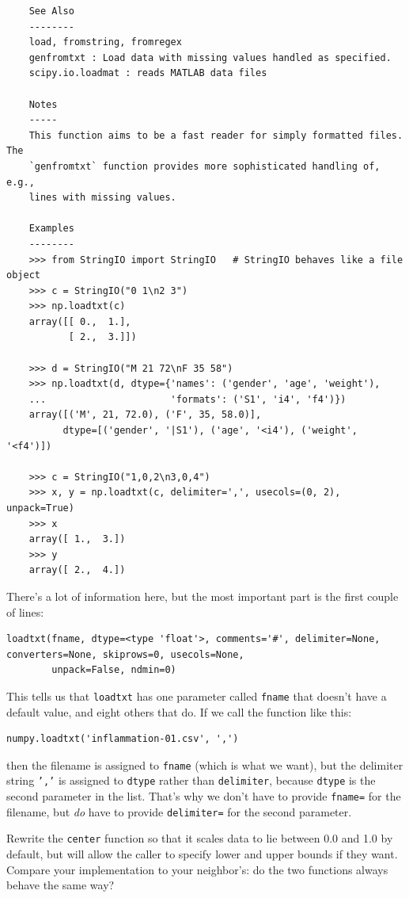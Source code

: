 \documentclass{book}
\begin{document}
\begin{verbatim}
    See Also
    --------
    load, fromstring, fromregex
    genfromtxt : Load data with missing values handled as specified.
    scipy.io.loadmat : reads MATLAB data files

    Notes
    -----
    This function aims to be a fast reader for simply formatted files.  The
    `genfromtxt` function provides more sophisticated handling of, e.g.,
    lines with missing values.

    Examples
    --------
    >>> from StringIO import StringIO   # StringIO behaves like a file object
    >>> c = StringIO("0 1\n2 3")
    >>> np.loadtxt(c)
    array([[ 0.,  1.],
           [ 2.,  3.]])

    >>> d = StringIO("M 21 72\nF 35 58")
    >>> np.loadtxt(d, dtype={'names': ('gender', 'age', 'weight'),
    ...                      'formats': ('S1', 'i4', 'f4')})
    array([('M', 21, 72.0), ('F', 35, 58.0)],
          dtype=[('gender', '|S1'), ('age', '<i4'), ('weight', '<f4')])

    >>> c = StringIO("1,0,2\n3,0,4")
    >>> x, y = np.loadtxt(c, delimiter=',', usecols=(0, 2), unpack=True)
    >>> x
    array([ 1.,  3.])
    >>> y
    array([ 2.,  4.])
\end{verbatim}

There's a lot of information here, but the most important part is the
first couple of lines:

\begin{verbatim}
loadtxt(fname, dtype=<type 'float'>, comments='#', delimiter=None, converters=None, skiprows=0, usecols=None,
        unpack=False, ndmin=0)
\end{verbatim}

This tells us that \texttt{loadtxt} has one parameter called
\texttt{fname} that doesn't have a default value, and eight others that
do. If we call the function like this:

\begin{verbatim}
numpy.loadtxt('inflammation-01.csv', ',')
\end{verbatim}

then the filename is assigned to \texttt{fname} (which is what we want),
but the delimiter string \texttt{','} is assigned to \texttt{dtype}
rather than \texttt{delimiter}, because \texttt{dtype} is the second
parameter in the list. That's why we don't have to provide
\texttt{fname=} for the filename, but \emph{do} have to provide
\texttt{delimiter=} for the second parameter.

\begin{challenge}
  Rewrite the \texttt{center} function so that it scales data to lie
  between 0.0 and 1.0 by default, but will allow the caller to specify
  lower and upper bounds if they want. Compare your implementation to
  your neighbor's: do the two functions always behave the same way?
\end{challenge}
\end{document}

